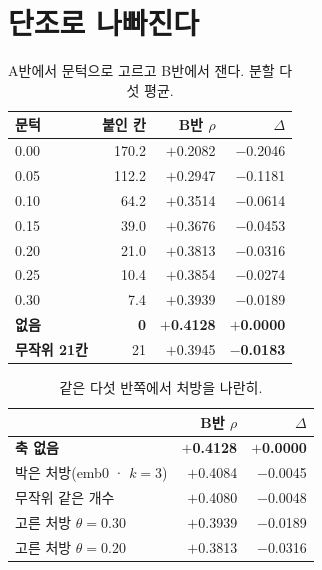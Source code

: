 \documentclass[10pt]{article}
\begin{document}
\section{단조로 나빠진다}

\begin{table}[t]
\centering\tsize
\caption{A반에서 문턱으로 고르고 B반에서 잰다. 분할 다섯 평균.}
\begin{tabular}{lrrr}
\toprule
문턱 & 붙인 칸 & B반 $\rho$ & $\Delta$ \\
\midrule
0.00 & 170.2 & $+$0.2082 & $-$0.2046 \\
0.05 & 112.2 & $+$0.2947 & $-$0.1181 \\
0.10 & 64.2 & $+$0.3514 & $-$0.0614 \\
0.15 & 39.0 & $+$0.3676 & $-$0.0453 \\
0.20 & 21.0 & $+$0.3813 & $-$0.0316 \\
0.25 & 10.4 & $+$0.3854 & $-$0.0274 \\
0.30 & 7.4 & $+$0.3939 & $-$0.0189 \\
\textbf{없음} & \textbf{0} & \textbf{$+$0.4128} & \textbf{$+$0.0000} \\
\midrule
\textbf{무작위 21칸} & 21 & $+$0.3945 & \textbf{$-$0.0183} \\
\bottomrule
\end{tabular}
\end{table}


\begin{table}[t]
\centering\tsize
\caption{같은 다섯 반쪽에서 처방을 나란히.}
\begin{tabular}{lrr}
\toprule
& B반 $\rho$ & $\Delta$ \\
\midrule
\textbf{축 없음} & \textbf{$+$0.4128} & \textbf{$+$0.0000} \\
박은 처방(emb0 · $k{=}3$) & $+$0.4084 & $-$0.0045 \\
무작위 같은 개수 & $+$0.4080 & $-$0.0048 \\
고른 처방 $\theta{=}0.30$ & $+$0.3939 & $-$0.0189 \\
고른 처방 $\theta{=}0.20$ & $+$0.3813 & $-$0.0316 \\
\bottomrule
\end{tabular}
\end{table}
\end{document}
